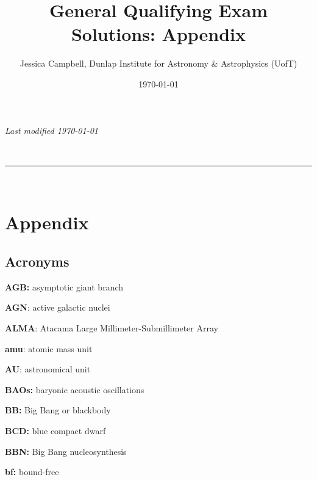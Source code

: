 \documentclass[a4paper,10pt]{article}
\makeatletter
\newcommand{\linia}{\rule{\linewidth}{0.5pt}}
\renewcommand{\maketitle}{
\begin{center}
\vspace{2ex}
{\huge \textsc{\@title}}
\vspace{1ex}
\\
\linia\\
\@author
\vspace{4ex}
\end{center}
}
\makeatother
\begin{document}
\hfill{\textit{Last modified \today}}
\title{General Qualifying Exam Solutions: Appendix}
\author{Jessica Campbell, Dunlap Institute for Astronomy \& Astrophysics (UofT)}
\date{\today}
\maketitle

\tableofcontents


\newpage
\section{Appendix}

\subsection{Acronyms}

{\noindent}\textbf{AGB:} asymptotic giant branch

{\noindent}\textbf{AGN}: active galactic nuclei

{\noindent}\textbf{ALMA}: Atacama Large Millimeter-Submillimeter Array

{\noindent}\textbf{amu}: atomic mass unit

{\noindent}\textbf{AU}: astronomical unit

{\noindent}\textbf{BAOs:} baryonic acoustic oscillations

{\noindent}\textbf{BB:} Big Bang or blackbody

{\noindent}\textbf{BCD:} blue compact dwarf

{\noindent}\textbf{BBN:} Big Bang nucleosynthesis

{\noindent}\textbf{bf:} bound-free
\end{document}
